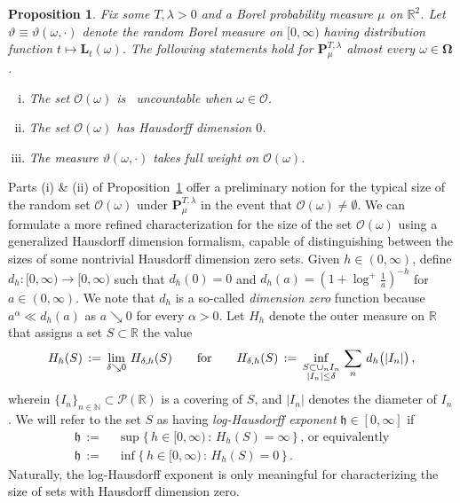 \documentclass[10pt]{article}
\numberwithin{equation}{section}
\newtheorem{proposition}[theorem]{Proposition}
\theoremstyle{definition}
\newcommand{\R}{{\mathbb R}}
\begin{document}
\begin{proposition}\label{PropZeroSetBasics}  Fix some $T,\lambda>0$ and a Borel probability measure $\mu$ on $\R^2$.
Let $\vartheta \equiv\vartheta(\omega, \cdot )$ denote the random Borel measure on $[0,\infty) $ having distribution function $t\mapsto \mathbf{L}_t(\omega)$. The following statements hold for $\mathbf{P}_{\mu}^{T,\lambda}$ almost every $\omega\in \boldsymbol{\Omega}$.
\begin{enumerate}[(i)]

\item The set $\mathscr{O}(\omega)$ is \ uncountable when $\omega\in \mathcal{O}$.


\item The set $\mathscr{O}(\omega)$   has Hausdorff dimension $0$.

\item The measure $\vartheta(\omega,\cdot)$ takes full weight  on $\mathscr{O}(\omega)$.


 \end{enumerate}
 
\end{proposition}

Parts (i) \& (ii) of Proposition~\ref{PropZeroSetBasics} offer a preliminary notion for the typical size of the random  set $\mathscr{O}(\omega)$ under $\mathbf{P}_{\mu}^{T,\lambda}$ in the event that $\mathscr{O}(\omega)\neq \emptyset$.   We can formulate a more refined characterization for the size of the set $\mathscr{O}(\omega)$
using a  generalized Hausdorff dimension formalism, capable of distinguishing between  the sizes of some nontrivial Hausdorff dimension zero sets.   Given  $h\in (0,\infty)$, define $d_{h}:[0,\infty)\rightarrow [0,\infty) $ such that $d_{h}(0)=0$ and   
$d_{h}(a)= (1+\log^+ \frac{1}{a})^{-h}    $ for $a\in (0,\infty)$. We note that $d_{h}$ is a so-called \textit{dimension zero} function because $a^{\alpha} \ll  d_{h}(a)$ as $a\searrow 0$ for every $\alpha>0$. Let $H_{h}$ denote the outer measure on $\R$ that assigns a set $S\subset \R $ the value
\begin{align}\label{LogHausMeas}
H_{h}(S)\,:=\,\lim_{\delta\searrow 0}\,H_{\delta,h}(S)  \hspace{.7cm}\text{for}\hspace{.7cm} H_{\delta,h}(S)\, :=\,\inf_{\substack{ S\subset \cup_n I_n  \\  |I_n|\leq \delta  }}\, \sum_{n}\,d_{h}\big(|I_n|\big) \,,  
\end{align}
wherein $\{I_n\}_{n\in \mathbb{N}} \subset \mathcal{P}(\R)$ is a covering of $S$, and $|I_n|$ denotes the diameter of $I_n$.  We will refer to the set $S$ as having \textit{log-Hausdorff exponent} $\mathfrak{h}\in [0,\infty]$ if
\begin{align}\label{LogHausExp}
\mathfrak{h}\,:=\,&\,\sup \big\{\, h\in [0,\infty)\, :\,  H_{h}(S)=\infty \,\big\}\,, \, \text{or equivalently} \nonumber \\   \mathfrak{h}\,:=\,&\, \inf \big\{\, h\in [0,\infty)\, :\,  H_{h}(S)=0 \,\big\}\,. 
\end{align}
 Naturally, the log-Hausdorff exponent is only meaningful for characterizing the size of sets with Hausdorff dimension zero.
 
\end{document}
